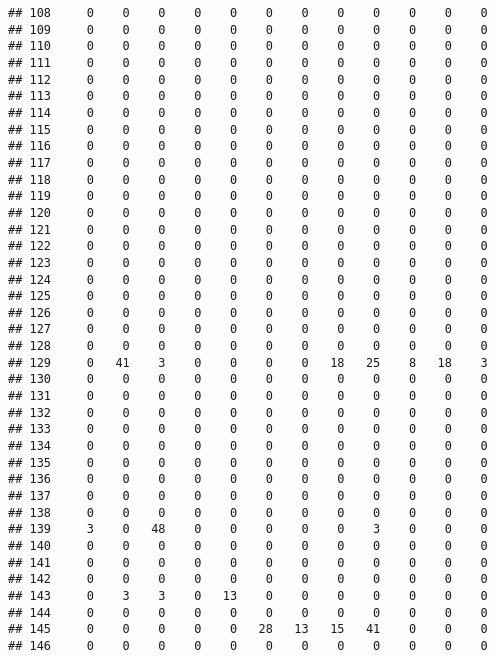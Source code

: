 \documentclass[]{article}
\begin{document}
\begin{verbatim}
## 108     0    0    0    0    0    0    0    0    0    0    0    0
## 109     0    0    0    0    0    0    0    0    0    0    0    0
## 110     0    0    0    0    0    0    0    0    0    0    0    0
## 111     0    0    0    0    0    0    0    0    0    0    0    0
## 112     0    0    0    0    0    0    0    0    0    0    0    0
## 113     0    0    0    0    0    0    0    0    0    0    0    0
## 114     0    0    0    0    0    0    0    0    0    0    0    0
## 115     0    0    0    0    0    0    0    0    0    0    0    0
## 116     0    0    0    0    0    0    0    0    0    0    0    0
## 117     0    0    0    0    0    0    0    0    0    0    0    0
## 118     0    0    0    0    0    0    0    0    0    0    0    0
## 119     0    0    0    0    0    0    0    0    0    0    0    0
## 120     0    0    0    0    0    0    0    0    0    0    0    0
## 121     0    0    0    0    0    0    0    0    0    0    0    0
## 122     0    0    0    0    0    0    0    0    0    0    0    0
## 123     0    0    0    0    0    0    0    0    0    0    0    0
## 124     0    0    0    0    0    0    0    0    0    0    0    0
## 125     0    0    0    0    0    0    0    0    0    0    0    0
## 126     0    0    0    0    0    0    0    0    0    0    0    0
## 127     0    0    0    0    0    0    0    0    0    0    0    0
## 128     0    0    0    0    0    0    0    0    0    0    0    0
## 129     0   41    3    0    0    0    0   18   25    8   18    3
## 130     0    0    0    0    0    0    0    0    0    0    0    0
## 131     0    0    0    0    0    0    0    0    0    0    0    0
## 132     0    0    0    0    0    0    0    0    0    0    0    0
## 133     0    0    0    0    0    0    0    0    0    0    0    0
## 134     0    0    0    0    0    0    0    0    0    0    0    0
## 135     0    0    0    0    0    0    0    0    0    0    0    0
## 136     0    0    0    0    0    0    0    0    0    0    0    0
## 137     0    0    0    0    0    0    0    0    0    0    0    0
## 138     0    0    0    0    0    0    0    0    0    0    0    0
## 139     3    0   48    0    0    0    0    0    3    0    0    0
## 140     0    0    0    0    0    0    0    0    0    0    0    0
## 141     0    0    0    0    0    0    0    0    0    0    0    0
## 142     0    0    0    0    0    0    0    0    0    0    0    0
## 143     0    3    3    0   13    0    0    0    0    0    0    0
## 144     0    0    0    0    0    0    0    0    0    0    0    0
## 145     0    0    0    0    0   28   13   15   41    0    0    0
## 146     0    0    0    0    0    0    0    0    0    0    0    0

\end{verbatim}
\end{document}

